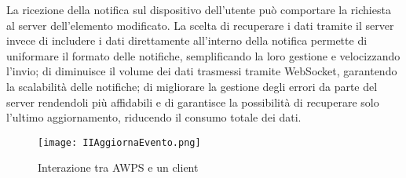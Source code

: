 La ricezione della notifica sul dispositivo dell’utente può comportare la richiesta al server dell’elemento modificato. La scelta di recuperare i dati tramite il server invece di includere i dati direttamente all’interno della notifica permette di uniformare il formato delle notifiche, semplificando la loro gestione e velocizzando l'invio; di diminuisce il volume dei dati trasmessi tramite WebSocket, garantendo la scalabilità delle notifiche; di migliorare la gestione degli errori da parte del server rendendoli più affidabili e di garantisce la possibilità di recuperare solo l’ultimo aggiornamento, riducendo il consumo totale dei dati.


\begin{figure}[h!]
    \centering
    \texttt{[image: IIAggiornaEvento.png]}
    \caption{Interazione tra AWPS e un client}
\end{figure}	

\clearpage